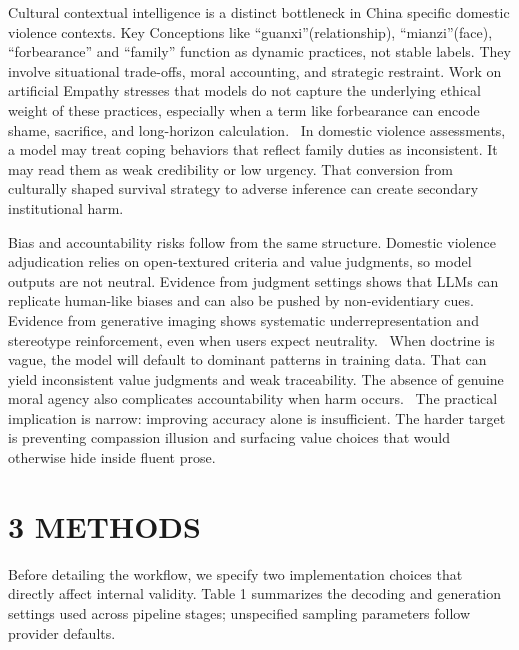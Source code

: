Cultural contextual intelligence is a distinct bottleneck in China specific domestic violence contexts. Key Conceptions like ``guanxi''(relationship), ``mianzi''(face), ``forbearance'' and ``family'' function as dynamic practices, not stable labels. They involve situational trade-offs, moral accounting, and strategic restraint. Work on artificial Empathy stresses that models do not capture the underlying ethical weight of these practices, especially when a term like forbearance can encode shame, sacrifice, and long-horizon calculation.~\cite{ref77} In domestic violence assessments, a model may treat coping behaviors that reflect family duties as inconsistent. It may read them as weak credibility or low urgency. That conversion from culturally shaped survival strategy to adverse inference can create secondary institutional harm.

Bias and accountability risks follow from the same structure. Domestic violence adjudication relies on open-textured criteria and value judgments, so model outputs are not neutral. Evidence from judgment settings shows that LLMs can replicate human-like biases and can also be pushed by non-evidentiary cues.~\cite{ref78} Evidence from generative imaging shows systematic underrepresentation and stereotype reinforcement, even when users expect neutrality.~\cite{ref79} When doctrine is vague, the model will default to dominant patterns in training data. That can yield inconsistent value judgments and weak traceability. The absence of genuine moral agency also complicates accountability when harm occurs.~\cite{ref80} The practical implication is narrow: improving accuracy alone is insufficient. The harder target is preventing compassion illusion and surfacing value choices that would otherwise hide inside fluent prose.

\hypertarget{methods}{%
\section{\texorpdfstring{\textbf{3 METHODS}}{3 METHODS}}\label{methods}}

Before detailing the workflow, we specify two implementation choices that directly affect internal validity. Table 1 summarizes the decoding and generation settings used across pipeline stages; unspecified sampling parameters follow provider defaults.

